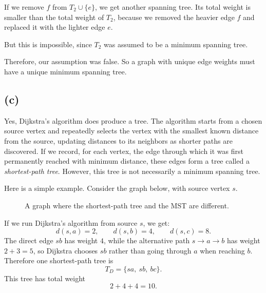 \documentclass{brockcosc3p03}
\begin{document}
If we remove $f$ from $T_2 \cup \{e\}$, we get another spanning tree. Its total weight is smaller than the total weight of $T_2$, because we removed the heavier edge $f$ and replaced it with the lighter edge $e$.

But this is impossible, since $T_2$ was assumed to be a minimum spanning tree.

Therefore, our assumption was false. So a graph with unique edge weights must have a unique minimum spanning tree.

\subsection*{(c)}

Yes, Dijkstra's algorithm does produce a tree. The algorithm starts from a chosen source vertex and repeatedly selects the vertex with the smallest known distance from the source, updating distances to its neighbors as shorter paths are discovered. If we record, for each vertex, the edge through which it was first permanently reached with minimum distance, these edges form a tree called a \emph{shortest-path tree}. However, this tree is not necessarily a minimum spanning tree.

Here is a simple example. Consider the graph below, with source vertex $s$.

\begin{figure}[H]
\centering
{}
\caption{A graph where the shortest-path tree and the MST are different.}
\label{fig:q4c-example}
\end{figure}

If we run Dijkstra's algorithm from source $s$, we get:
\[
d(s,a)=2, \qquad d(s,b)=4, \qquad d(s,c)=8.
\]
The direct edge $sb$ has weight $4$, while the alternative path $s \to a \to b$ has weight $2+3=5$, so Dijkstra chooses $sb$ rather than going through $a$ when reaching $b$. Therefore one shortest-path tree is
\[
T_D = \{sa,\ sb,\ bc\}.
\]
This tree has total weight
\[
2+4+4=10.
\]
\end{document}
